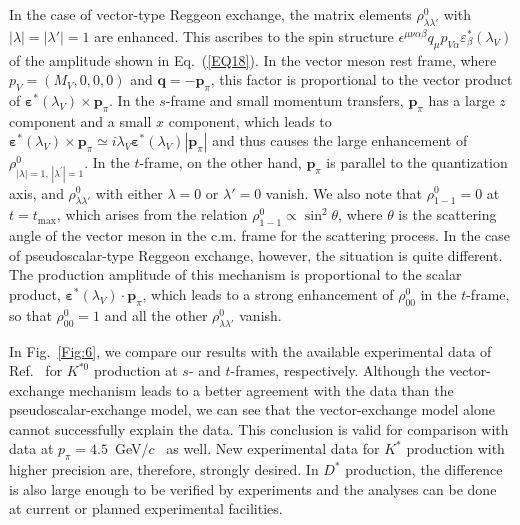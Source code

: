 \documentclass[a4paper,12pt]{article}
\begin{document}
In the case of vector-type Reggeon exchange, the matrix elements $\rho^0_{\lambda\lambda'}$
with $|{\lambda}| = |{\lambda'}| = 1$ are enhanced.
This ascribes to the spin structure
$\epsilon^{\mu\nu\alpha\beta} q_{\mu}^{} p_{V\alpha}^{} \varepsilon^{*}_\beta(\lambda_V^{})$
of the amplitude shown in Eq.~(\ref{EQ18}).
%
In the vector meson rest frame, where $p_V^{} = (M_V^{},0,0,0)$ and $\bm{q} = - \bm{p}_\pi^{}$,
this factor is proportional to the vector product of ${\bm{\varepsilon}}^*(\lambda_V^{}) \times \bm{p}_\pi^{}$.
In the $s$-frame and small momentum transfers, $\bm{p}_\pi^{}$ has a large $z$ component
and a small $x$ component, which leads to ${\bm\varepsilon}^*(\lambda_V^{}) \times \bm{p}_\pi^{}
\simeq i\lambda_V {\bm\varepsilon}^*(\lambda_V^{})|\bm{p}_\pi|$
and thus causes the large enhancement of $\rho^0_{|{\lambda}| = 1,\, |{\lambda^\prime}| = 1}$.
In the $t$-frame, on the other hand, $\bm{p}_\pi^{}$ is parallel to the quantization axis, and
$\rho^0_{\lambda\lambda'}$ with either $\lambda = 0$ or $\lambda' = 0$ vanish.
We also note that $\rho_{1-1}^{0} = 0$ at $t = t_{\mathrm{max}}$, which arises
from the relation $\rho_{1-1}^{0} \propto \sin^2\theta$, where $\theta$ is the scattering
angle of the vector meson in the c.m. frame for the scattering process.
In the case of pseudoscalar-type Reggeon exchange, however, the situation is quite different.
The production amplitude of this mechanism is proportional to the scalar product,
$\bm{\varepsilon}^*(\lambda_V^{}) \cdot \bm{p}_\pi^{}$, which leads to a strong enhancement of
$\rho^0_{00}$ in the $t$-frame, so that $\rho^0_{00}=1$ and all the other
$\rho^0_{\lambda\lambda'}$ vanish.


In Fig.~\ref{Fig:6}, we compare our results with the available
experimental data of Ref.~\cite{CGLS72} for $K^{*0}$ production at $s$- and $t$-frames,
respectively.
Although the vector-exchange mechanism leads to a better agreement with the
data than the pseudoscalar-exchange model, we can see that the vector-exchange model
alone cannot successfully explain the data.
This conclusion is valid for comparison with data at
$p_{\pi}^{}=4.5$~GeV/$c$~\cite{CGLS72} as well.
 New experimental data for $K^*$ production with higher precision are, therefore,
strongly desired.
In $D^*$ production, the difference is also large enough to be verified by experiments and
the analyses can be done at current or planned experimental facilities.
\end{document}
